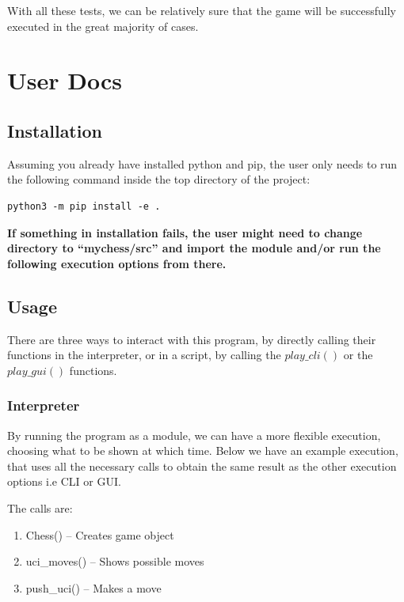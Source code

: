 \documentclass[10pt]{article}
\begin{document}
With all these tests, we can be relatively sure that the game will be successfully
executed in the great majority of cases.



\section{User Docs}

\subsection{Installation}

Assuming you already have installed python and pip, the user only needs to run
the following command inside the top directory of the project:
\begin{lstlisting}
python3 -m pip install -e .
\end{lstlisting}

\textbf{If something in installation fails, the user might need to change directory to
        ``mychess/src'' and import the module and/or run the following execution options
        from there.}

\subsection{Usage}

There are three ways to interact with this program, by directly calling their
functions in the interpreter, or in a script, by calling the $play\_cli()$ or the
$play\_gui()$ functions. 

\subsubsection{Interpreter}

By running the program as a module, we can have a more flexible execution,
choosing what to be shown at which time. Below we have an example execution,
that uses all the necessary calls to obtain the same result as the other
execution options i.e CLI or GUI.

The calls are:

\begin{enumerate}[label=\arabic*)]
\item Chess() -- Creates game object
\item uci\_moves() -- Shows possible moves
\item push\_uci() -- Makes a move
\end{enumerate}
\end{document}
